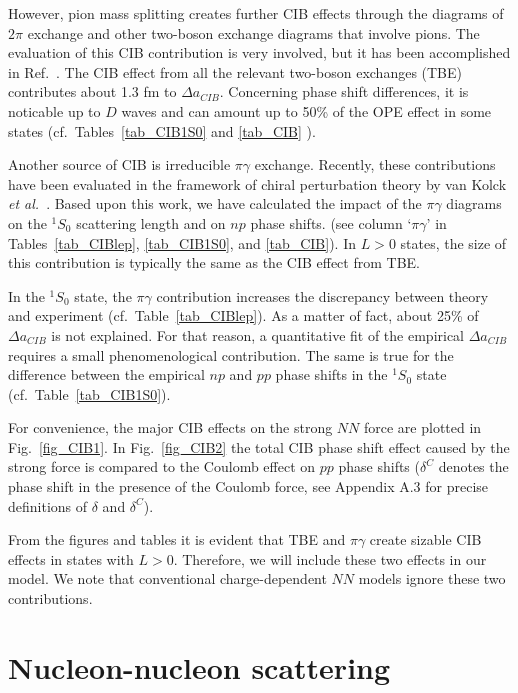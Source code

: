 However, pion mass splitting creates further CIB effects through
the diagrams of $2\pi$ exchange and other two-boson exchange diagrams
that involve pions. The evaluation of this
CIB contribution is very involved, but it has been accomplished
in Ref.~\cite{LM98b}. The CIB effect from all the relevant two-boson
exchanges (TBE) 
contributes about 1.3 fm to $\Delta a_{CIB}$.
Concerning phase shift differences,
it is noticable up to $D$ waves and can amount up to 50\% 
of the OPE effect in some states
(cf.\ Tables~\ref{tab_CIB1S0} and \ref{tab_CIB} \cite{foot2}).

Another source of CIB is irreducible $\pi\gamma$ exchange. 
Recently, these contributions have been
evaluated in the framework of chiral perturbation theory
by van Kolck {\it et al.}~\cite{Kol98}. Based upon this work,
we have calculated the impact of the $\pi\gamma$ diagrams on
the $^1S_0$ scattering length and on $np$ phase shifts.
(see column `$\pi\gamma$' in Tables~\ref{tab_CIBlep}, \ref{tab_CIB1S0},
and \ref{tab_CIB}).
In $L>0$ states, the size of this contribution is typically
the same as the CIB effect from TBE.

In the $^1S_0$ state, the $\pi\gamma$ contribution increases the
discrepancy between theory and experiment (cf.\ Table~\ref{tab_CIBlep}).
As a matter of fact, about 25\% of 
$\Delta a_{CIB}$
is not explained. For that reason, a quantitative fit
of the empirical
$\Delta a_{CIB}$
requires a small phenomenological contribution.
The same is true for the difference between the empirical
$np$ and $pp$ phase shifts in the $^1S_0$ state 
(cf.\ Table~\ref{tab_CIB1S0}).

For convenience, the major CIB effects on the strong $NN$ force
are plotted in Fig.~\ref{fig_CIB1}. 
In Fig.~\ref{fig_CIB2} the total CIB phase shift effect caused
by the strong force is compared to the Coulomb effect 
on $pp$ phase shifts ($\delta^C$ denotes the phase
shift in the presence of the Coulomb force, see Appendix 
A.3 for precise definitions
of $\delta$ and $\delta^C$).

From the figures and tables it is evident that TBE and $\pi\gamma$ create
sizable CIB effects in states with $L>0$. 
Therefore, we will include these two effects in our model.
We note that conventional charge-dependent
$NN$ models ignore these two contributions.



\section{Nucleon-nucleon scattering}

